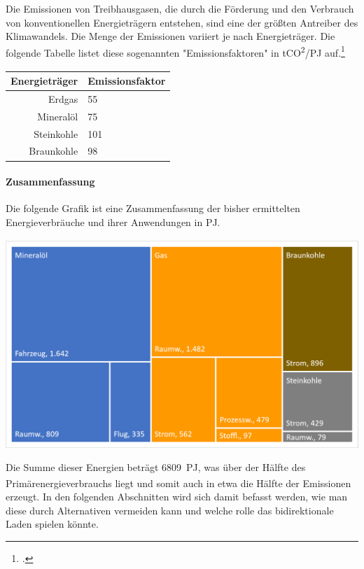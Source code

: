 \documentclass[12pt, ngerman]{article}
\newcommand{\pe}{_{\mathrm{PE}}}
\begin{document}
Die Emissionen von Treibhausgasen, die durch die Förderung und den Verbrauch von konventionellen Energieträgern
entstehen, sind eine der größten Antreiber des Klimawandels.
Die Menge der Emissionen variiert je nach Energieträger. Die folgende Tabelle
listet diese sogenannten "Emissionsfaktoren" in \unit{tCO^2/PJ\pe} auf.\footcite{balserOlUndGas}

\begin{center}
    \begin{tabular}{r|l}
        \toprule
        Energieträger & Emissionsfaktor \\
        \midrule
        Erdgas        & 55              \\
        Mineralöl     & 75              \\
        Steinkohle    & 101             \\
        Braunkohle    & 98              \\
        \bottomrule
    \end{tabular}
\end{center}

\paragraph{Zusammenfassung}

Die folgende Grafik ist eine Zusammenfassung der bisher ermittelten Energieverbräuche und ihrer Anwendungen in \unit{PJ\pe}.

\includegraphics{anwendung}

Die Summe dieser Energien beträgt \qty{6809}{PJ\pe}, was über der Hälfte des Primärenergieverbrauchs liegt und somit auch
in etwa die Hälfte der Emissionen erzeugt. In den folgenden Abschnitten wird sich damit befasst werden, wie man
diese durch Alternativen vermeiden kann und welche rolle das bidirektionale Laden spielen könnte.
\end{document}
